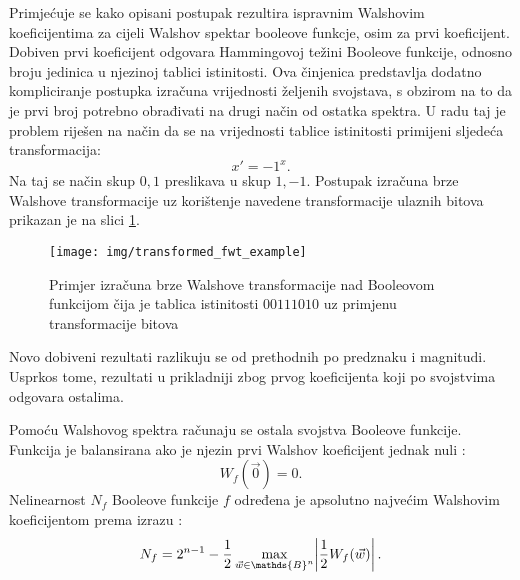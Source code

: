 Primjećuje se kako opisani postupak rezultira ispravnim Walshovim koeficijentima za cijeli Walshov spektar booleove funkcje, osim za prvi koeficijent.
Dobiven prvi koeficijent odgovara Hammingovoj težini Booleove funkcije, odnosno broju jedinica u njezinoj tablici istinitosti.
Ova činjenica predstavlja dodatno kompliciranje postupka izračuna vrijednosti željenih svojstava, s obzirom na to da je prvi broj potrebno obrađivati na drugi način od ostatka spektra.
U radu \cite{MeasuringBoolean} taj je problem riješen na način da se na vrijednosti tablice istinitosti primijeni sljedeća transformacija:
\begin{equation}
    x' = -1^x.
\end{equation}
Na taj se način skup ${0, 1}$ preslikava u skup ${1, -1}$.
Postupak izračuna brze Walshove transformacije uz korištenje navedene transformacije ulaznih bitova prikazan je na slici \ref{fig:transformed_fwt_example}.
\begin{figure}[ht!] 
    \centering
    \texttt{[image: img/transformed\_fwt\_example]}
    \captionsetup{justification=centering}
    \caption{Primjer izračuna brze Walshove transformacije nad Booleovom funkcijom čija je tablica istinitosti $00111010$ uz primjenu transformacije bitova}
    \label{fig:transformed_fwt_example}
\end{figure}
Novo dobiveni rezultati razlikuju se od prethodnih po predznaku i magnitudi.
Usprkos tome, rezultati u prikladniji zbog prvog koeficijenta koji po svojstvima odgovara ostalima.

Pomoću Walshovog spektra računaju se ostala svojstva Booleove funkcije.
Funkcija je balansirana ako je njezin prvi Walshov koeficijent jednak nuli \cite{MaximalNonlinearity}:
\begin{equation}
    W_f(\vec{0}) = 0.
\end{equation} 
Nelinearnost $N_f$ Booleove funkcije $f$ određena je apsolutno najvećim Walshovim koeficijentom prema izrazu \cite{MaximalNonlinearity}:
\begin{equation}
    N_f = 2^{n-1} - \frac{1}{2}\max_{\vec{w} \in \mathds{B}^n} \abs{\frac{1}{2}W_f(\vec{w})}.
\end{equation}